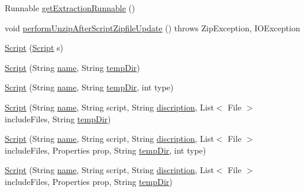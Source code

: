 \begin{DoxyCompactItemize}
\item 
Runnable \hyperlink{class_c_a_s_u_a_l_1_1caspac_1_1_script_a545611076ea6c3b3e8e0b2ab22e66e4f}{get\-Extraction\-Runnable} ()
\item 
void \hyperlink{class_c_a_s_u_a_l_1_1caspac_1_1_script_a335fa094032e79c5be3daa0e7cdf511c}{perform\-Unzip\-After\-Script\-Zipfile\-Update} ()  throws Zip\-Exception, I\-O\-Exception 
\item 
\hyperlink{class_c_a_s_u_a_l_1_1caspac_1_1_script_a817dc05b31f3530869f8ef2c5b9bc2b2}{Script} (\hyperlink{class_c_a_s_u_a_l_1_1caspac_1_1_script}{Script} s)
\item 
\hyperlink{class_c_a_s_u_a_l_1_1caspac_1_1_script_aa2c99871b0dad53e547497fd030a995f}{Script} (String \hyperlink{class_c_a_s_u_a_l_1_1caspac_1_1_script_a3efcef19df03c62a6c70b08dc56630a7}{name}, String \hyperlink{class_c_a_s_u_a_l_1_1caspac_1_1_script_add96e553bd0b9511f74ac7e41cba4536}{temp\-Dir})
\item 
\hyperlink{class_c_a_s_u_a_l_1_1caspac_1_1_script_ad1dadc2cf2ae9ff6f0dbcab2d7683076}{Script} (String \hyperlink{class_c_a_s_u_a_l_1_1caspac_1_1_script_a3efcef19df03c62a6c70b08dc56630a7}{name}, String \hyperlink{class_c_a_s_u_a_l_1_1caspac_1_1_script_add96e553bd0b9511f74ac7e41cba4536}{temp\-Dir}, int type)
\item 
\hyperlink{class_c_a_s_u_a_l_1_1caspac_1_1_script_acf090cbcc44153ce1b981630408849c7}{Script} (String \hyperlink{class_c_a_s_u_a_l_1_1caspac_1_1_script_a3efcef19df03c62a6c70b08dc56630a7}{name}, String script, String \hyperlink{class_c_a_s_u_a_l_1_1caspac_1_1_script_af7d466f393929435e6a6ccecacc324de}{discription}, List$<$ File $>$ include\-Files, String \hyperlink{class_c_a_s_u_a_l_1_1caspac_1_1_script_add96e553bd0b9511f74ac7e41cba4536}{temp\-Dir})
\item 
\hyperlink{class_c_a_s_u_a_l_1_1caspac_1_1_script_ab116bbfc07a8bf5350c5a80b0cb2ec90}{Script} (String \hyperlink{class_c_a_s_u_a_l_1_1caspac_1_1_script_a3efcef19df03c62a6c70b08dc56630a7}{name}, String script, String \hyperlink{class_c_a_s_u_a_l_1_1caspac_1_1_script_af7d466f393929435e6a6ccecacc324de}{discription}, List$<$ File $>$ include\-Files, Properties prop, String \hyperlink{class_c_a_s_u_a_l_1_1caspac_1_1_script_add96e553bd0b9511f74ac7e41cba4536}{temp\-Dir}, int type)
\item 
\hyperlink{class_c_a_s_u_a_l_1_1caspac_1_1_script_a9f76bf636c370bc47a78d42aa7b1bd6e}{Script} (String \hyperlink{class_c_a_s_u_a_l_1_1caspac_1_1_script_a3efcef19df03c62a6c70b08dc56630a7}{name}, String script, String \hyperlink{class_c_a_s_u_a_l_1_1caspac_1_1_script_af7d466f393929435e6a6ccecacc324de}{discription}, List$<$ File $>$ include\-Files, Properties prop, String \hyperlink{class_c_a_s_u_a_l_1_1caspac_1_1_script_add96e553bd0b9511f74ac7e41cba4536}{temp\-Dir})

\end{DoxyCompactItemize}
